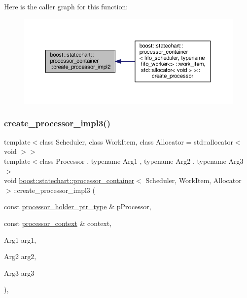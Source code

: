 Here is the caller graph for this function\+:
\nopagebreak
\begin{figure}[H]
\begin{center}
\leavevmode
\includegraphics[width=350pt]{classboost_1_1statechart_1_1processor__container_a4374dc658b395822eec1043189b90ab1_icgraph}
\end{center}
\end{figure}
\mbox{\label{classboost_1_1statechart_1_1processor__container_a980c59d8fe706a16906373841b911cac}} 
\subsubsection{\texorpdfstring{create\+\_\+processor\+\_\+impl3()}{create\_processor\_impl3()}}
{\footnotesize\ttfamily template$<$class Scheduler, class Work\+Item, class Allocator = std\+::allocator$<$ void $>$$>$ \\
template$<$class Processor , typename Arg1 , typename Arg2 , typename Arg3 $>$ \\
void \mbox{\hyperlink{classboost_1_1statechart_1_1processor__container}{boost\+::statechart\+::processor\+\_\+container}}$<$ Scheduler, Work\+Item, Allocator $>$\+::create\+\_\+processor\+\_\+impl3 (\begin{DoxyParamCaption}\item[{const \mbox{\hyperlink{classboost_1_1statechart_1_1processor__container_a885e5a42694857bfaa44ec053ed20a57}{processor\+\_\+holder\+\_\+ptr\+\_\+type}} \&}]{p\+Processor,  }\item[{const \mbox{\hyperlink{classboost_1_1statechart_1_1processor__container_1_1processor__context}{processor\+\_\+context}} \&}]{context,  }\item[{Arg1}]{arg1,  }\item[{Arg2}]{arg2,  }\item[{Arg3}]{arg3 }\end{DoxyParamCaption})\hspace{0.3cm}{\ttfamily [inline]}, {\ttfamily [private]}}

